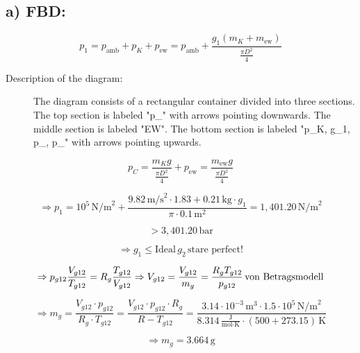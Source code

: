 \subsection*{a) FBD:}

\[
p_1 = p_{\text{amb}} + p_K + p_{\text{ew}} = p_{\text{amb}} + \frac{g_1 (m_K + m_{\text{ew}})}{\frac{\pi D^2}{4}}
\]

\begin{description}
    \item[Description of the diagram:]
    The diagram consists of a rectangular container divided into three sections. The top section is labeled "p_{}" with arrows pointing downwards. The middle section is labeled "EW". The bottom section is labeled "p_K, g_1, p_{}, p_{}" with arrows pointing upwards.
\end{description}

\[
p_C = \frac{m_K g}{\frac{\pi D^2}{4}} + p_{\text{ew}} = \frac{m_{\text{ew}} g}{\frac{\pi D^2}{4}}
\]

\[
\Rightarrow p_1 = 10^5 \, \text{N/m}^2 + \frac{9.82 \, \text{m/s}^2 \cdot 1.83 + 0.21 \, \text{kg} \cdot g_1}{\pi \cdot 0.1 \, \text{m}^2} = 1,401.20 \, \text{N/m}^2
\]

\[
> 3,401.20 \, \text{bar}
\]

\[
\Rightarrow g_1 \leq \text{Ideal} \, g_2 \, \text{stare perfect!}
\]

\[
\Rightarrow p_{g12} \frac{V_{g12}}{T_{g12}} = R_g \frac{T_{g12}}{V_{g12}} \Rightarrow V_{g12} = \frac{V_{g12}}{m_g} = \frac{R_g T_{g12}}{p_{g12}} \, \text{von \text{Betragsmodell}}
\]

\[
\Rightarrow m_g = \frac{V_{g12} \cdot p_{g12}}{R_g \cdot T_{g12}} = \frac{V_{g12} \cdot p_{g12} \cdot R_g}{R - T_{g12}} = \frac{3.14 \cdot 10^{-3} \, \text{m}^3 \cdot 1.5 \cdot 10^5 \, \text{N/m}^2}{8.314 \, \frac{\text{J}}{\text{mol} \cdot \text{K}} \cdot (500 + 273.15) \, \text{K}}
\]

\[
\Rightarrow m_g = 3.664 \, \text{g}
\]